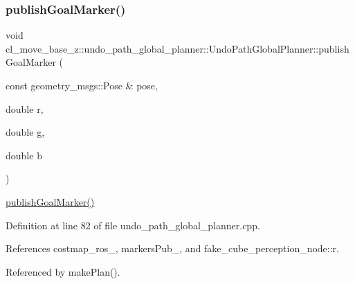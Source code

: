 \subsubsection{\texorpdfstring{publish\+Goal\+Marker()}{publishGoalMarker()}}
{\footnotesize\ttfamily void cl\+\_\+move\+\_\+base\+\_\+z\+::undo\+\_\+path\+\_\+global\+\_\+planner\+::\+Undo\+Path\+Global\+Planner\+::publish\+Goal\+Marker (\begin{DoxyParamCaption}\item[{const geometry\+\_\+msgs\+::\+Pose \&}]{pose,  }\item[{double}]{r,  }\item[{double}]{g,  }\item[{double}]{b }\end{DoxyParamCaption})\hspace{0.3cm}{\ttfamily [private]}}

\hyperlink{classcl__move__base__z_1_1undo__path__global__planner_1_1UndoPathGlobalPlanner_a37a85e1cd57173902d8302cb8cb9b933}{publish\+Goal\+Marker()} 

Definition at line 82 of file undo\+\_\+path\+\_\+global\+\_\+planner.\+cpp.



References costmap\+\_\+ros\+\_\+, markers\+Pub\+\_\+, and fake\+\_\+cube\+\_\+perception\+\_\+node\+::r.



Referenced by make\+Plan().


